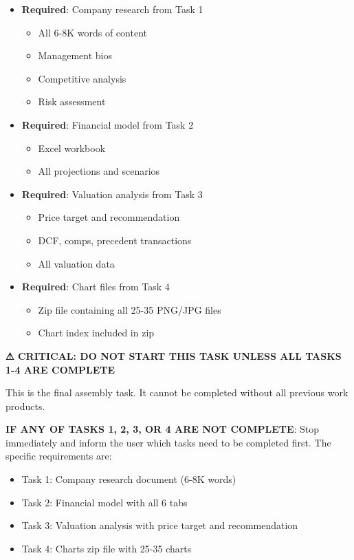 \documentclass[11pt]{article}
\begin{document}
\begin{itemize}[leftmargin=*,itemsep=2pt,topsep=2pt]
\item {} \textbf{Required}: Company research from Task 1
\begin{itemize}[leftmargin=*,itemsep=2pt,topsep=2pt]
\item {} All 6-8K words of content
\item {} Management bios
\item {} Competitive analysis
\item {} Risk assessment
\end{itemize}
\item {} \textbf{Required}: Financial model from Task 2
\begin{itemize}[leftmargin=*,itemsep=2pt,topsep=2pt]
\item {} Excel workbook
\item {} All projections and scenarios
\end{itemize}
\item {} \textbf{Required}: Valuation analysis from Task 3
\begin{itemize}[leftmargin=*,itemsep=2pt,topsep=2pt]
\item {} Price target and recommendation
\item {} DCF, comps, precedent transactions
\item {} All valuation data
\end{itemize}
\item {} \textbf{Required}: Chart files from Task 4
\begin{itemize}[leftmargin=*,itemsep=2pt,topsep=2pt]
\item {} Zip file containing all 25-35 PNG/JPG files
\item {} Chart index included in zip
\end{itemize}
\end{itemize}

\textbf{⚠ CRITICAL: DO NOT START THIS TASK UNLESS ALL TASKS 1-4 ARE COMPLETE}


This is the final assembly task. It cannot be completed without all previous work products.


\textbf{IF ANY OF TASKS 1, 2, 3, OR 4 ARE NOT COMPLETE}: Stop immediately and inform the user which tasks need to be completed first. The specific requirements are:

\begin{itemize}[leftmargin=*,itemsep=2pt,topsep=2pt]
\item {} Task 1: Company research document (6-8K words)
\item {} Task 2: Financial model with all 6 tabs
\item {} Task 3: Valuation analysis with price target and recommendation
\item {} Task 4: Charts zip file with 25-35 charts
\end{itemize}
\end{document}
